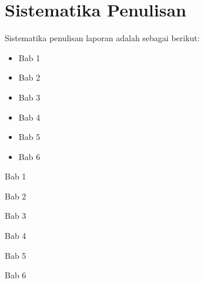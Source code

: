 \section{Sistematika Penulisan}
Sistematika penulisan laporan adalah sebagai berikut:
\begin{itemize}
	\item Bab 1 \babSatu \\
	\item Bab 2 \babDua \\
	\item Bab 3 \babTiga \\
	\item Bab 4 \babEmpat \\
	\item Bab 5 \babLima \\
	\item Bab 6 \kesimpulan \\
\end{itemize}

Bab 1

Bab 2

Bab 3

Bab 4

Bab 5

Bab 6

